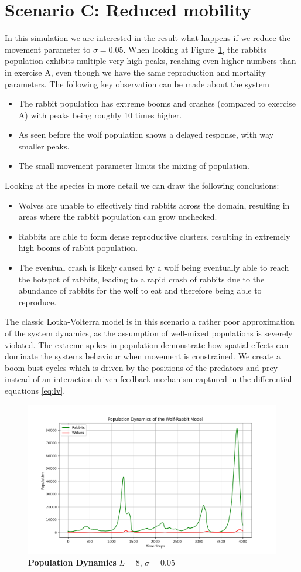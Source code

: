 \section*{Scenario C: Reduced mobility}
In this simulation we are interested in the result what happens if we reduce the movement parameter to $\sigma = 0.05$.
When looking at Figure~\ref{fig:ex03}, the rabbits population exhibits multiple very high peaks, reaching even higher numbers than in exercise A, even though we have the same reproduction and mortality parameters.
The following key observation can be made about the system
\begin{itemize}
	\item The rabbit population has extreme booms and crashes (compared to exercise A) with peaks being roughly 10 times higher.
	\item As seen before the wolf population shows a delayed response, with way smaller peaks.
	\item The small movement parameter limits the mixing of population.
\end{itemize}
Looking at the species in more detail we can draw the following conclusions:
\begin{itemize}
	\item Wolves are unable to effectively find rabbits across the domain, resulting in areas where the rabbit population can grow unchecked.
	\item Rabbits are able to form dense reproductive clusters, resulting in extremely high booms of rabbit population.
	\item The eventual crash is likely caused by a wolf being eventually able to reach the hotspot of rabbits, leading to a rapid crash of rabbits due to the abundance of rabbits for the wolf to eat and therefore being able to reproduce.
\end{itemize}
The classic Lotka-Volterra model is in this scenario a rather poor approximation of the system dynamics, as the assumption of well-mixed populations is severely violated. The extreme spikes in population demonstrate how spatial effects can dominate the systems behaviour when movement is constrained. We create a boom-bust cycles which is driven by the positions of the predators and prey instead of an interaction driven feedback mechanism captured in the differential equations \eqref{eq:lv}.
\begin{figure}[H]
	\centering
	\includegraphics[width=\textwidth]{./media/population_dynamics_ex03.png}
	\caption{
		\textbf{Population Dynamics}
		$L = 8$, $\sigma = 0.05$
	}
	\label{fig:ex03}
\end{figure}

